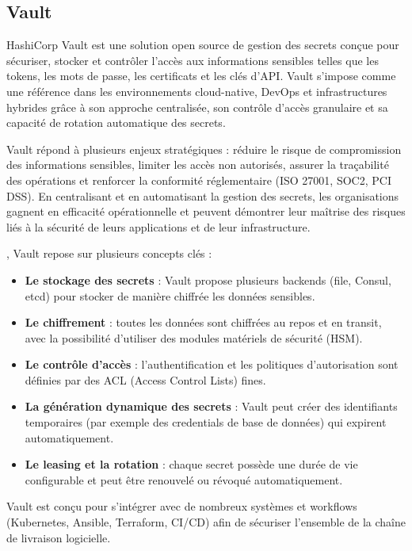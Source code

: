 \subsection{Vault}

HashiCorp Vault est une solution open source de gestion des secrets conçue pour sécuriser, stocker et contrôler l’accès aux informations sensibles telles que les tokens, les mots de passe, les certificats et les clés d’API. Vault s’impose comme une référence dans les environnements cloud-native, DevOps et infrastructures hybrides grâce à son approche centralisée, son contrôle d’accès granulaire et sa capacité de rotation automatique des secrets.

 Vault répond à plusieurs enjeux stratégiques  : réduire le risque de compromission des informations sensibles, limiter les accès non autorisés, assurer la traçabilité des opérations et renforcer la conformité réglementaire (ISO 27001, SOC2, PCI DSS). En centralisant et en automatisant la gestion des secrets, les organisations gagnent en efficacité opérationnelle et peuvent démontrer leur maîtrise des risques liés à la sécurité de leurs applications et de leur infrastructure.

, Vault repose sur plusieurs concepts clés  :
\begin{itemize}
	\item \textbf{Le stockage des secrets}  : Vault propose plusieurs backends (file, Consul, etcd) pour stocker de manière chiffrée les données sensibles.
	\item \textbf{Le chiffrement}  : toutes les données sont chiffrées au repos et en transit, avec la possibilité d’utiliser des modules matériels de sécurité (HSM).
	\item \textbf{Le contrôle d’accès}  : l’authentification et les politiques d’autorisation sont définies par des ACL (Access Control Lists) fines.
	\item \textbf{La génération dynamique des secrets}  : Vault peut créer des identifiants temporaires (par exemple des credentials de base de données) qui expirent automatiquement.
	\item \textbf{Le leasing et la rotation}  : chaque secret possède une durée de vie configurable et peut être renouvelé ou révoqué automatiquement.
\end{itemize}

Vault est conçu pour s’intégrer avec de nombreux systèmes et workflows (Kubernetes, Ansible, Terraform, CI/CD) afin de sécuriser l’ensemble de la chaîne de livraison logicielle.

